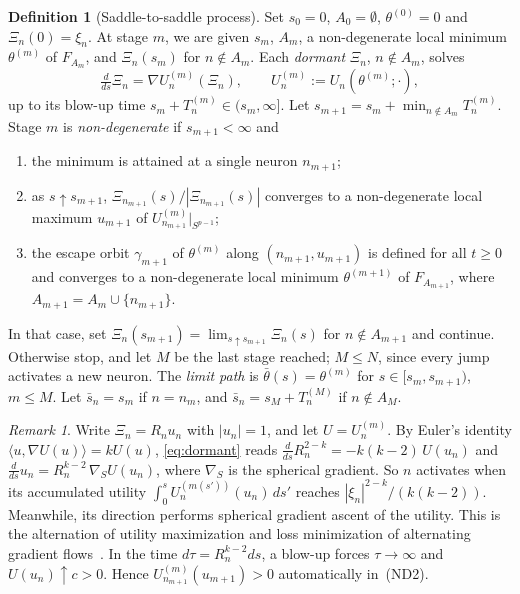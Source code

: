 \documentclass[11pt]{article}
\theoremstyle{definition}
\newtheorem{definition}{Definition}
\theoremstyle{remark}
\newtheorem*{remark}{Remark}
\newcommand{\ip}[2]{\langle #1,#2\rangle}
\newcommand{\ND}[1]{\textup{(ND#1)}}
\begin{document}
\begin{definition}[Saddle-to-saddle process]\label{def:process}
Set $s_0=0$, $A_0=\emptyset$, $\theta^{(0)}=0$ and $\Xi_n(0)=\xi_n$. At stage $m$, we are given $s_m$, $A_m$, a non-degenerate local minimum $\theta^{(m)}$ of $F_{A_m}$, and $\Xi_n(s_m)$ for $n\notin A_m$. Each \emph{dormant} $\Xi_n$, $n\notin A_m$, solves
\begin{equation}\label{eq:dormant}
\tfrac{d}{ds}\Xi_n=\nabla U^{(m)}_n(\Xi_n),\qquad U^{(m)}_n:=U_n(\theta^{(m)};\cdot),
\end{equation}
up to its blow-up time $s_m+T^{(m)}_n\in(s_m,\infty]$. Let $s_{m+1}=s_m+\min_{n\notin A_m}T^{(m)}_n$. Stage $m$ is \emph{non-degenerate} if $s_{m+1}<\infty$ and
\begin{enumerate}[label=\textup{(ND\arabic*)},leftmargin=4em,nosep]
\item the minimum is attained at a single neuron $n_{m+1}$;
\item as $s\uparrow s_{m+1}$, $\Xi_{n_{m+1}}(s)/|\Xi_{n_{m+1}}(s)|$ converges to a non-degenerate local maximum $u_{m+1}$ of $U^{(m)}_{n_{m+1}}|_{S^{p-1}}$;
\item the escape orbit $\gamma_{m+1}$ of $\theta^{(m)}$ along $(n_{m+1},u_{m+1})$ is defined for all $t\ge0$ and converges to a non-degenerate local minimum $\theta^{(m+1)}$ of $F_{A_{m+1}}$, where $A_{m+1}=A_m\cup\{n_{m+1}\}$.
\end{enumerate}
In that case, set $\Xi_n(s_{m+1})=\lim_{s\uparrow s_{m+1}}\Xi_n(s)$ for $n\notin A_{m+1}$ and continue. Otherwise stop, and let $M$ be the last stage reached; $M\le N$, since every jump activates a new neuron. The \emph{limit path} is $\bar\theta(s)=\theta^{(m)}$ for $s\in[s_m,s_{m+1})$, $m\le M$. Let $\bar s_n=s_m$ if $n=n_m$, and $\bar s_n=s_M+T^{(M)}_n$ if $n\notin A_M$.
\end{definition}

\begin{remark}
Write $\Xi_n=R_nu_n$ with $|u_n|=1$, and let $U=U^{(m)}_n$. By Euler's identity $\ip{u}{\nabla U(u)}=kU(u)$, \eqref{eq:dormant} reads $\frac{d}{ds}R_n^{2-k}=-k(k-2)\,U(u_n)$ and $\frac{d}{ds}u_n=R_n^{k-2}\,\nabla_{S}U(u_n)$, where $\nabla_S$ is the spherical gradient. So $n$ activates when its accumulated utility $\int_0^sU^{(m(s'))}_n(u_n)\,ds'$ reaches $|\xi_n|^{2-k}/(k(k-2))$. Meanwhile, its direction performs spherical gradient ascent of the utility. This is the alternation of utility maximization and loss minimization of alternating gradient flows~\cite{KMC25}. In the time $d\tau=R_n^{k-2}ds$, a blow-up forces $\tau\to\infty$ and $U(u_n)\uparrow c>0$. Hence $U^{(m)}_{n_{m+1}}(u_{m+1})>0$ automatically in~\ND2.
\end{remark}
\end{document}
